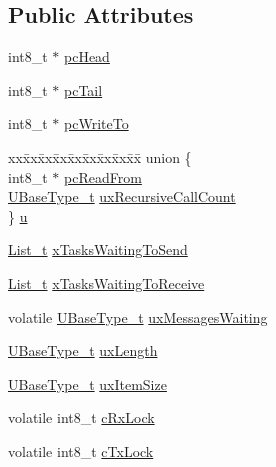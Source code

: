 \subsection*{Public Attributes}
\begin{DoxyCompactItemize}
\item 
int8\+\_\+t $\ast$ \hyperlink{struct_queue_definition_a487dc7e43b380c58212cba72bc33e0ed}{pc\+Head}
\item 
int8\+\_\+t $\ast$ \hyperlink{struct_queue_definition_a189dc1b16fc2152dd9441ea1a117b0ce}{pc\+Tail}
\item 
int8\+\_\+t $\ast$ \hyperlink{struct_queue_definition_abdf13cc013c8488848cee3fce4f0fed3}{pc\+Write\+To}
\item 
\begin{tabbing}
xx\=xx\=xx\=xx\=xx\=xx\=xx\=xx\=xx\=\kill
union \{\\
\>int8\_t $\ast$ \hyperlink{struct_queue_definition_a970cf73ab9c7382b581bc310b1d947d5}{pcReadFrom}\\
\>\hyperlink{portmacro_8h_a646f89d4298e4f5afd522202b11cb2e6}{UBaseType\_t} \hyperlink{struct_queue_definition_a2cf88e286477f6f89fe1009d722dc4cf}{uxRecursiveCallCount}\\
\} \hyperlink{struct_queue_definition_a3a2be4f333e88fd5bc1ddb7ae8441e28}{u}\\

\end{tabbing}\item 
\hyperlink{list_8h_afd590ef6400071b4d63d65ef90bea7f4}{List\+\_\+t} \hyperlink{struct_queue_definition_aaab135c4345cb0393d6ff3cd5164c7b2}{x\+Tasks\+Waiting\+To\+Send}
\item 
\hyperlink{list_8h_afd590ef6400071b4d63d65ef90bea7f4}{List\+\_\+t} \hyperlink{struct_queue_definition_af6d61526f77beee659cd604a0c473359}{x\+Tasks\+Waiting\+To\+Receive}
\item 
volatile \hyperlink{portmacro_8h_a646f89d4298e4f5afd522202b11cb2e6}{U\+Base\+Type\+\_\+t} \hyperlink{struct_queue_definition_a12b07a40152d0f21488ca06d362d13d1}{ux\+Messages\+Waiting}
\item 
\hyperlink{portmacro_8h_a646f89d4298e4f5afd522202b11cb2e6}{U\+Base\+Type\+\_\+t} \hyperlink{struct_queue_definition_ae80d17a812c669d4d41265b7f693988c}{ux\+Length}
\item 
\hyperlink{portmacro_8h_a646f89d4298e4f5afd522202b11cb2e6}{U\+Base\+Type\+\_\+t} \hyperlink{struct_queue_definition_a81bb7d3826909244baa9debf5a55abb0}{ux\+Item\+Size}
\item 
volatile int8\+\_\+t \hyperlink{struct_queue_definition_ac750a3f75a6e174adbc697e473a0dd13}{c\+Rx\+Lock}
\item 
volatile int8\+\_\+t \hyperlink{struct_queue_definition_a24ac3f0707f098da2a22244d843fcf82}{c\+Tx\+Lock}
\end{DoxyCompactItemize}


